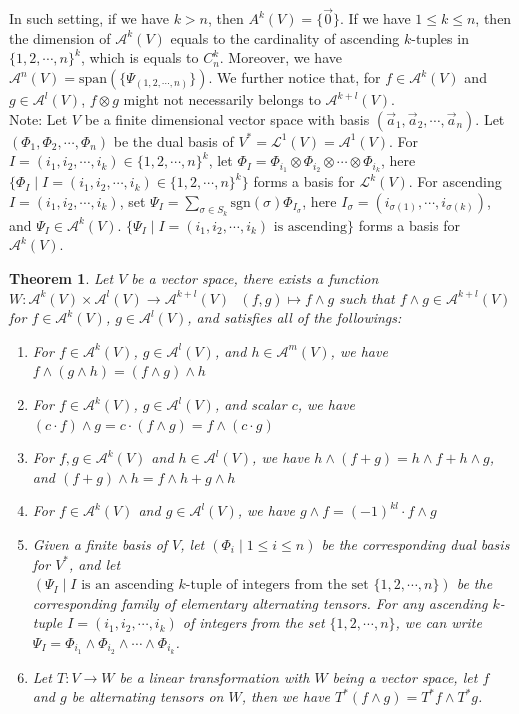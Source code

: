 \documentclass[11pt,oneside]{book}
\theoremstyle{break}
\theoremstyle{break}
\newtheorem{thm}{Theorem}[section]
\newcommand{\Lt}{\mathcal{L}}
\newcommand{\A}{\mathcal{A}}
\newcommand{\spa}{\text{span}}
\newcommand{\note}{\color{red}Note: \color{black}}
\begin{document}
In such setting, if we have $k>n$, then $A^k(V) = \{ \vec{0}\}$. If we have $1\leq k \leq n$, then the dimension of $\A^k(V)$ equals to the cardinality of ascending $k$-tuples in $\{1,2,\cdots, n\}^k$, which is equals to $C_n^k$. Moreover, we have $\A^n(V) = \spa(\{\Psi_{(1,2,\cdots, n)}\})$. We further notice that, for $f\in \A^k(V)$ and $g \in \A^l(V)$, $f\otimes g$ might not necessarily belongs to $\A^{k+l}(V)$.\\


\note Let $V$ be a finite dimensional vector space with basis $(\vec{a}_1,\vec{a}_2,\cdots, \vec{a}_n)$. Let $(\Phi_1,\Phi_2,\cdots, \Phi_n)$ be the dual basis of $V^* = \Lt^1(V) = \A^1(V)$. For $I = (i_1,i_2,\cdots, i_k) \in \{1,2,\cdots, n\}^k$, let $\Phi_I = \Phi_{i_1}\otimes \Phi_{i_2} \otimes \cdots \otimes \Phi_{i_k}$, here $\{\Phi_I\mid I = (i_1,i_2,\cdots, i_k) \in \{1,2,\cdots, n\}^k\}$ forms a basis for $\Lt^k(V)$. For ascending $I= (i_1,i_2,\cdots, i_k)$, set $\Psi_I  = \sum_{\sigma \in S_k}\text{sgn}(\sigma) \Phi_{I_{\sigma}}$, here $I_{\sigma} = (i_{\sigma(1)},\cdots, i_{\sigma(k)})$, and $\Psi_I \in \A^k(V)$. $\{\Psi_I \mid I= (i_1,i_2,\cdots, i_k) \text{ is ascending}\}$ forms a basis for $\A^k(V)$. 
\begin{thm}
Let $V$ be a vector space, there exists a function $W:\A^k(V) \times \A^l(V) \to \A^{k+l}(V) \ \ \ (f,g)\mapsto f \wedge g$ such that $f\wedge g \in \A^{k+l}(V)$ for $f \in \A^k(V)$, $g \in \A^l(V)$, and satisfies all of the followings:
\begin{enumerate}[topsep=3pt,itemsep=-1ex,partopsep=1ex,parsep=1ex]
\item For $f \in \A^k(V)$, $g \in \A^l(V)$, and $h \in \A^m(V)$, we have $f\wedge(g\wedge h) = (f\wedge g) \wedge h$
\item For $f \in \A^k(V)$, $g \in \A^l(V)$, and scalar $c$, we have $(c\cdot f) \wedge g = c\cdot (f\wedge g) = f\wedge (c\cdot g)$
\item For $f,g \in \A^k(V)$ and $h \in \A^l(V)$, we have $h\wedge (f+g) = h\wedge f + h\wedge g$, and $(f+g)\wedge h = f\wedge h + g \wedge h$
\item For $f \in \A^k(V)$ and $g \in \A^l(V)$, we have $g\wedge f = (-1)^{kl} \cdot f\wedge g$
\item Given a finite basis of $V$, let $(\Phi_i \mid 1 \leq i \leq n)$ be the corresponding dual basis for $V^*$, and let $(\Psi_I\mid I \text{ is an ascending }k\text{-tuple}\text{ of integers from the set }\{1,2,\cdots, n\})$ be the corresponding family of elementary alternating tensors. For any  ascending $k$-tuple $I = (i_1,i_2,\cdots, i_k)$ of integers from the set $\{1,2,\cdots, n\}$, we can write $\Psi_I = \Phi_{i_1}\wedge \Phi_{i_2}\wedge \cdots \wedge \Phi_{i_k}$. 
\item Let $T:V\to W$ be a linear transformation with $W$ being a vector space, let $f$ and $g$ be alternating tensors on $W$, then we have $T^*(f\wedge g) = T^*f \wedge T^* g$. 
\end{enumerate}
\end{thm}
\end{document}
